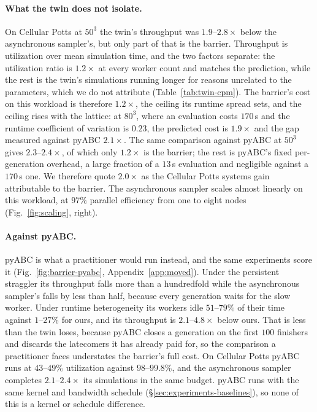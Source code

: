 \documentclass[10pt]{article}
\theoremstyle{plain}
\theoremstyle{definition}
\begin{document}
\paragraph{What the twin does not isolate.} On Cellular Potts at $50^3$ the twin's throughput was $1.9$--$2.8\times$ below the asynchronous sampler's, but only part of that is the barrier. Throughput is utilization over mean simulation time, and the two factors separate: the utilization ratio is $1.2\times$ at every worker count and matches the prediction, while the rest is the twin's simulations running longer for reasons unrelated to the parameters, which we do not attribute (Table~\ref{tab:twin-cpm}). The barrier's cost on this workload is therefore $1.2\times$, the ceiling its runtime spread sets, and the ceiling rises with the lattice: at $80^3$, where an evaluation costs $170$\,s and the runtime coefficient of variation is $0.23$, the predicted cost is $1.9\times$ and the gap measured against pyABC $2.1\times$. The same comparison against pyABC at $50^3$ gives $2.3$--$2.4\times$, of which only $1.2\times$ is the barrier; the rest is pyABC's fixed per-generation overhead, a large fraction of a $13$\,s evaluation and negligible against a $170$\,s one. We therefore quote $2.0\times$ as the Cellular Potts systems gain attributable to the barrier. The asynchronous sampler scales almost linearly on this workload, at $97\%$ parallel efficiency from one to eight nodes (Fig.~\ref{fig:scaling}, right).

\paragraph{Against pyABC.} pyABC is what a practitioner would run instead, and the same experiments score it (Fig.~\ref{fig:barrier-pyabc}, Appendix~\ref{app:moved}). Under the persistent straggler its throughput falls more than a hundredfold while the asynchronous sampler's falls by less than half, because every generation waits for the slow worker. Under runtime heterogeneity its workers idle $51$--$79\%$ of their time against $1$--$27\%$ for ours, and its throughput is $2.1$--$4.8\times$ below ours. That is less than the twin loses, because pyABC closes a generation on the first $100$ finishers and discards the latecomers it has already paid for, so the comparison a practitioner faces understates the barrier's full cost. On Cellular Potts pyABC runs at $43$--$49\%$ utilization against $98$--$99.8\%$, and the asynchronous sampler completes $2.1$--$2.4\times$ its simulations in the same budget. pyABC runs with the same kernel and bandwidth schedule (\S\ref{sec:experiments-baselines}), so none of this is a kernel or schedule difference.
\end{document}
